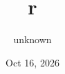 \documentclass[letterpaper,10pt,english]{sphinxmanual}
\title{r}
\date{Oct 16, 2026}
\author{unknown}
\begin{document}
\pagestyle{empty}
\sphinxmaketitle
\pagestyle{plain}
\sphinxtableofcontents
\pagestyle{normal}
\label{\detokenize{index::doc}}




\renewcommand{\indexname}{Index}
\printindex
\end{document}
